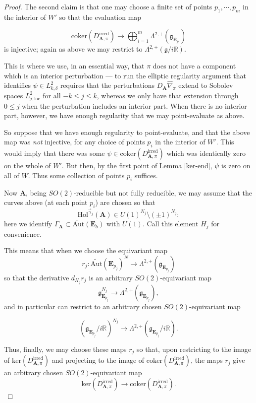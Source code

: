\documentclass[10pt,a4paper]{amsart}
\theoremstyle{definition}
\theoremstyle{remark}
\numberwithin{figure}{qchap}
\begin{document}
\begin{proof}
The second claim is that one may choose a finite set of points $p_1, \cdots, p_m$ in the interior of $W'$ so that the evaluation map

$$\text{coker}(D^{\text{irred}}_{\mathbf{A},\pi}) \to \bigoplus_{i=1}^m \Lambda^{2,+}(\mathfrak g_{\mathbf{E}_{p_i}})$$
is injective; again as above we may restrict to $\Lambda^{2,+}(\mathfrak g/i\mathbb R)$.

This is where we use, in an essential way, that $\pi$ does not have a component which is an interior perturbation --- to run the elliptic regularity argument that identifies $\psi \in L^2_{k,\delta}$ requires that the perturbations $D_{\mathbf{A}}\widehat{\nabla}_\pi$ extend to Sobolev spaces $L^2_{j,\text{loc}}$ for all $-k \leq j \leq k$, whereas we only have that extension through $0 \leq j$ when the perturbation includes an interior part. When there is no interior part, however, we have enough regularity that we may point-evaluate as above.

So suppose that we have enough regularity to point-evaluate, and that the above map was \emph{not} injective, for any choice of points $p_i$ in the interior of $W'$. This would imply that there was some $\psi \in \text{coker}(D^{\text{irred}}_{\mathbf{A},\pi})$ which was identically zero on the whole of $W'$. But then, by the first point of Lemma \ref{ker-end}, $\psi$ is zero on all of $W$. Thus some collection of points $p_i$ suffices.

Now $\mathbf{A}$, being $SO(2)$-reducible but not fully reducible, we may assume that the curves above (at each point $p_i$) are chosen so that
$$\text{Hol}^{\vec \gamma_j}(\mathbf{A}) \in U(1)^{N_j} \setminus (\pm 1)^{N_j}:$$
here we identify $\Gamma_{\mathbf{A}} \subset \widetilde{\text{Aut}}(\mathbf{E}_b)$ with $U(1)$. Call this element $H_j$ for convenience.

This means that when we choose the equivariant map
$$r_j: \widetilde{\text{Aut}}(\mathbf{E}_{p_j})^N \to \Lambda^{2,+}\left(\mathfrak g_{\mathbf{E}_{p_j}}\right)$$
so that the derivative $d_{H_j} r_j$ is an arbitrary $SO(2)$-equivariant map
$$\mathfrak{g}_{\mathbf{E}_{p_j}}^{N_j} \to \Lambda^{2,+}\left(\mathfrak g_{\mathbf{E}_{p_j}}\right),$$
and in particular can restrict to an arbitrary chosen $SO(2)$-equivariant map

$$\left(\mathfrak g_{\mathbf{E}_{p_j}}/i\mathbb R\right)^{N_j} \to \Lambda^{2,+}\left(\mathfrak g_{\mathbf{E}_{p_j}}/i\mathbb R\right).$$

Thus, finally, we may choose these maps $r_j$ so that, upon restricting to the image of $\text{ker}(D^{\text{irred}}_{\mathbf{A},\pi})$ and projecting to the image of $\text{coker}(D^{\text{irred}}_{\mathbf{A},\pi})$, the maps $r_j$ give an arbitrary chosen $SO(2)$-equivariant map
$$\text{ker}(D^{\text{irred}}_{\mathbf{A},\pi})\to \text{coker}(D^{\text{irred}}_{\mathbf{A},\pi}).$$


\end{proof}
\end{document}
